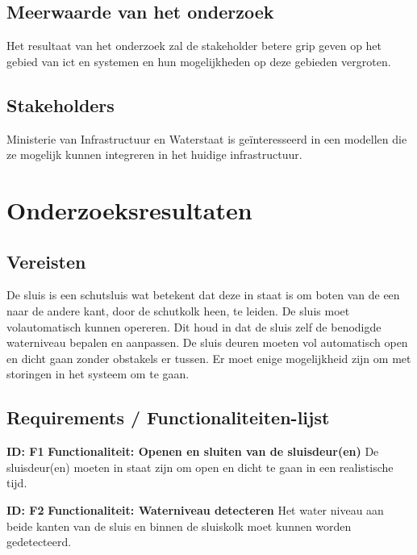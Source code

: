 \documentclass{article}
\begin{document}
\subsection{Meerwaarde van het onderzoek}
Het resultaat van het onderzoek zal de stakeholder betere grip geven op het gebied van ict en systemen en hun mogelijkheden op deze gebieden vergroten. 

\subsection{Stakeholders}
Ministerie van Infrastructuur en Waterstaat is geïnteresseerd in een modellen die ze mogelijk kunnen integreren in het huidige infrastructuur.



\section{Onderzoeksresultaten}

\subsection{Vereisten}

De sluis is een schutsluis wat betekent dat deze in staat is om boten van de een naar de andere kant, door de schutkolk heen, te leiden. De sluis moet volautomatisch kunnen opereren. Dit houd in dat de sluis zelf de benodigde waterniveau bepalen en aanpassen. De sluis deuren moeten vol automatisch open en dicht gaan zonder obstakels er tussen. Er moet enige mogelijkheid zijn om met storingen in het systeem om te gaan.


\subsection{Requirements / Functionaliteiten-lijst}\label{sec:FuncList}
\textbf{ID: F1} \newline
\textbf{Functionaliteit: Openen en sluiten van de sluisdeur(en)} \newline
De sluisdeur(en) moeten in staat zijn om open en dicht te gaan in een realistische tijd. \newline

\textbf{ID: F2} \newline
\textbf{Functionaliteit: Waterniveau detecteren} \newline
Het water niveau aan beide kanten van de sluis en binnen de sluiskolk moet kunnen worden gedetecteerd. \newline
\end{document}
